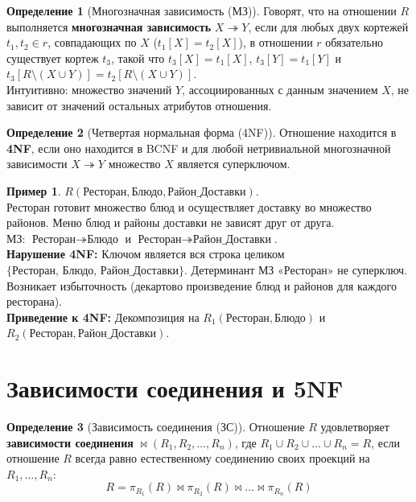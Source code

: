 \documentclass[12pt,a4paper]{article}
\theoremstyle{definition}
\newtheorem{definition}{Определение}
\newtheorem{example}{Пример}
\theoremstyle{plain}
\begin{document}
\begin{definition}[Многозначная зависимость (МЗ)]
Говорят, что на отношении $R$ выполняется \textbf{многозначная зависимость} $X \twoheadrightarrow Y$, если для любых двух кортежей $t_1, t_2 \in r$, совпадающих по $X$ ($t_1[X] = t_2[X]$), в отношении $r$ обязательно существует кортеж $t_3$, такой что $t_3[X] = t_1[X]$, $t_3[Y] = t_1[Y]$ и $t_3[R \setminus (X \cup Y)] = t_2[R \setminus (X \cup Y)]$. \\
Интуитивно: множество значений $Y$, ассоциированных с данным значением $X$, не зависит от значений остальных атрибутов отношения.
\end{definition}

\begin{definition}[Четвертая нормальная форма (4NF)]
Отношение находится в \textbf{4NF}, если оно находится в BCNF и для любой нетривиальной многозначной зависимости $X \twoheadrightarrow Y$ множество $X$ является суперключом.
\end{definition}

\begin{example}
$R(\text{Ресторан}, \text{Блюдо}, \text{Район\_Доставки})$. \\
Ресторан готовит множество блюд и осуществляет доставку во множество районов. Меню блюд и районы доставки не зависят друг от друга. \\
МЗ: $\text{Ресторан} \twoheadrightarrow \text{Блюдо}$ и $\text{Ресторан} \twoheadrightarrow \text{Район\_Доставки}$. \\
\textbf{Нарушение 4NF:} Ключом является вся строка целиком $\{\text{Ресторан, Блюдо, Район\_Доставки}\}$. Детерминант МЗ «Ресторан» не суперключ. Возникает избыточность (декартово произведение блюд и районов для каждого ресторана). \\
\textbf{Приведение к 4NF:} Декомпозиция на $R_1(\text{Ресторан}, \text{Блюдо})$ и $R_2(\text{Ресторан}, \text{Район\_Доставки})$.
\end{example}

\section{Зависимости соединения и 5NF}

\begin{definition}[Зависимость соединения (ЗС)]
Отношение $R$ удовлетворяет \textbf{зависимости соединения} $\bowtie(R_1, R_2, \dots, R_n)$, где $R_1 \cup R_2 \cup \dots \cup R_n = R$, если отношение $R$ всегда равно естественному соединению своих проекций на $R_1, \dots, R_n$:
$$R = \pi_{R_1}(R) \bowtie \pi_{R_2}(R) \bowtie \dots \bowtie \pi_{R_n}(R)$$
\end{definition}
\end{document}
